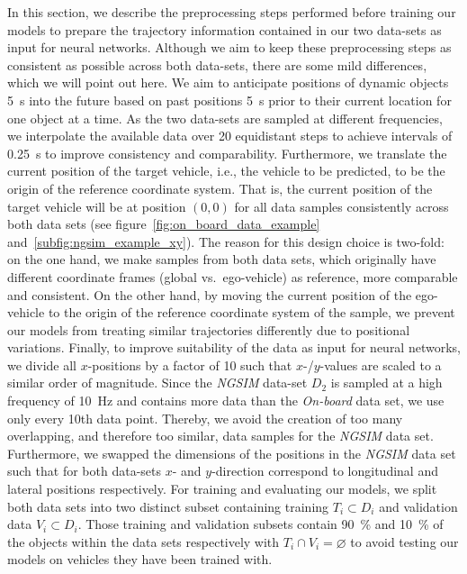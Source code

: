 In this section, we describe the preprocessing steps performed before training our models to prepare the trajectory information contained in our two data-sets as input for neural networks.
Although we aim to keep these preprocessing steps as consistent as possible across both data-sets, there are some mild differences, which we will point out here.
We aim to anticipate positions of dynamic objects \SI{5}{\second} into the future based on past positions \SI{5}{\second} prior to their current location for one object at a time.
As the two data-sets are sampled at different frequencies, we interpolate the available data over \num{20} equidistant steps to achieve intervals of \SI{0.25}{\second} to improve consistency and comparability.
Furthermore, we translate the current position of the target vehicle, i.e., the vehicle to be predicted, to be the origin of the reference coordinate system.
That is, the current position of the target vehicle will be at position $\left(0,0\right)$ for all data samples consistently across both data sets (see figure~\ref{fig:on_board_data_example} and~\ref{subfig:ngsim_example_xy}).
The reason for this design choice is two-fold: on the one hand, we make samples from both data sets, which originally have different coordinate frames (global vs.\ ego-vehicle) as reference, more comparable and consistent.
On the other hand, by moving the current position of the ego-vehicle to the origin of the reference coordinate system of the sample, we prevent our models from treating similar trajectories differently due to positional variations.
Finally, to improve suitability of the data as input for neural networks, we divide all $x$-positions by a factor of \num{10} such that $x$-/$y$-values are scaled to a similar order of magnitude.
Since the \emph{\acs{NGSIM}} data-set $D_2$ is sampled at a high frequency of \SI{10}{\hertz} and contains more data than the \emph{On-board} data set, we use only every \num{10}th data point.
Thereby, we avoid the creation of too many overlapping, and therefore too similar, data samples for the \emph{\ac{NGSIM}} data set.
Furthermore, we swapped the dimensions of the positions in the \emph{\ac{NGSIM}} data set such that for both data-sets $x$- and $y$-direction correspond to longitudinal and lateral positions respectively.
For training and evaluating our models, we split both data sets into two distinct subset containing training $T_i \subset D_i$ and validation data $V_i \subset D_i$.
Those training and validation subsets contain \SI{90}{\percent} and \SI{10}{\percent} of the objects within the data sets respectively with $T_i \cap V_i = \varnothing$ to avoid testing our models on vehicles they have been trained with.

